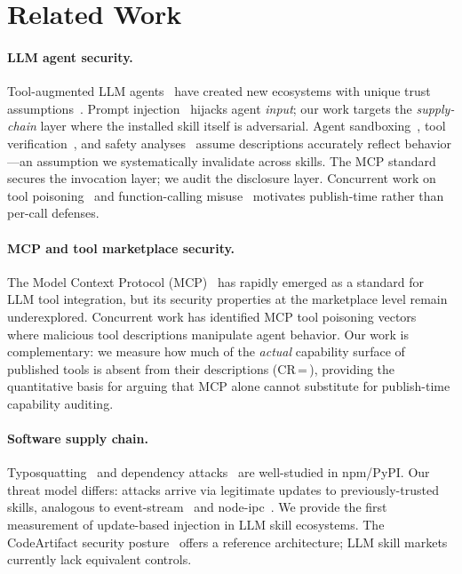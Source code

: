 
\section{Related Work}
\label{sec:related}

\paragraph{LLM agent security.}
Tool-augmented LLM agents~\cite{yao2023react,schick2024toolformer,significant2023autogpt}
have created new ecosystems with unique trust assumptions~\cite{xi2023rise}.
Prompt injection~\cite{greshake2023indirect} hijacks agent {\em input};
our work targets the {\em supply-chain} layer where the installed skill
itself is adversarial. Agent sandboxing~\cite{andriessen2024sandbox,ruan2024identifying},
tool verification~\cite{liu2024toolauth}, and safety analyses~\cite{tian2024evil}
assume descriptions accurately reflect behavior---an assumption we
systematically invalidate across \NskillsDMR{} skills.
The MCP standard~\cite{anthropic2024mcp}
secures the invocation layer; we audit the disclosure layer.
Concurrent work on tool poisoning~\cite{wu2024toolsword} and
function-calling misuse~\cite{shi2024ehragent} motivates
publish-time rather than per-call defenses.

\paragraph{MCP and tool marketplace security.}
The Model Context Protocol (MCP)~\cite{anthropic2024mcp} has rapidly emerged
as a standard for LLM tool integration, but its security properties
at the marketplace level remain underexplored.
Concurrent work has identified MCP tool poisoning vectors~\cite{wu2024toolsword}
where malicious tool descriptions manipulate agent behavior.
Our work is complementary: we measure how much of the \emph{actual} capability
surface of published tools is absent from their descriptions (CR\,=\,\ResultCR{}),
providing the quantitative basis for arguing that MCP alone
cannot substitute for publish-time capability auditing.

\paragraph{Software supply chain.}
Typosquatting~\cite{vu2020typosquatting,taylor2020confused}
and dependency attacks~\cite{ohm2020backstabber,ladisa2023taxonomy}
are well-studied in npm/PyPI.
Our threat model differs: attacks arrive via legitimate updates
to previously-trusted skills, analogous to
event-stream~\cite{right2018eventstream} and node-ipc~\cite{snyk2022nodeipc}.
We provide the first measurement of update-based injection in LLM skill ecosystems.
The CodeArtifact security posture~\cite{lamb2022evaluating}
offers a reference architecture; LLM skill markets currently lack equivalent controls.

